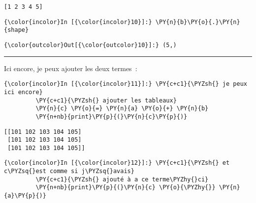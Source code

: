     \begin{Verbatim}[commandchars=\\\{\},frame=single,framerule=0.3mm,rulecolor=\color{cellframecolor}]
[1 2 3 4 5]
\end{Verbatim}

    \begin{Verbatim}[commandchars=\\\{\},frame=single,framerule=0.3mm,rulecolor=\color{cellframecolor}]
{\color{incolor}In [{\color{incolor}10}]:} \PY{n}{b}\PY{o}{.}\PY{n}{shape}
\end{Verbatim}


\begin{Verbatim}[commandchars=\\\{\},frame=single,framerule=0.3mm,rulecolor=\color{cellframecolor}]
{\color{outcolor}Out[{\color{outcolor}10}]:} (5,)
\end{Verbatim}
            
    \begin{center}\rule{0.5\linewidth}{\linethickness}\end{center}

    Ici encore, je peux ajouter les deux termes~:

    \begin{Verbatim}[commandchars=\\\{\},frame=single,framerule=0.3mm,rulecolor=\color{cellframecolor}]
{\color{incolor}In [{\color{incolor}11}]:} \PY{c+c1}{\PYZsh{} je peux ici encore}
         \PY{c+c1}{\PYZsh{} ajouter les tableaux}
         \PY{n}{c} \PY{o}{=} \PY{n}{a} \PY{o}{+} \PY{n}{b}
         \PY{n+nb}{print}\PY{p}{(}\PY{n}{c}\PY{p}{)}
\end{Verbatim}


    \begin{Verbatim}[commandchars=\\\{\},frame=single,framerule=0.3mm,rulecolor=\color{cellframecolor}]
[[101 102 103 104 105]
 [101 102 103 104 105]
 [101 102 103 104 105]]
\end{Verbatim}

    \begin{Verbatim}[commandchars=\\\{\},frame=single,framerule=0.3mm,rulecolor=\color{cellframecolor}]
{\color{incolor}In [{\color{incolor}12}]:} \PY{c+c1}{\PYZsh{} et c\PYZsq{}est comme si j\PYZsq{}avais}
         \PY{c+c1}{\PYZsh{} ajouté à a ce terme\PYZhy{}ci}
         \PY{n+nb}{print}\PY{p}{(}\PY{n}{c} \PY{o}{\PYZhy{}} \PY{n}{a}\PY{p}{)}
\end{Verbatim}



